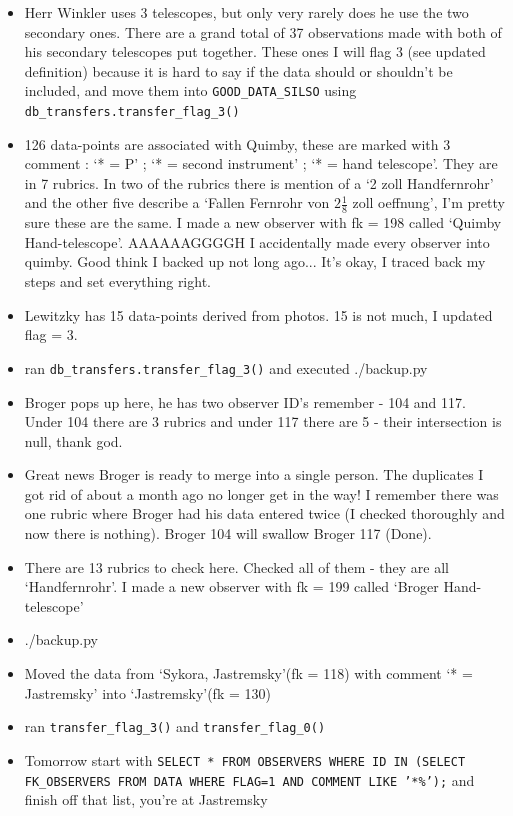 \documentclass[12pt]{article}
\begin{document}
\begin{itemize}
    \item Herr Winkler uses 3 telescopes, but only very rarely does he use the two secondary ones. There are a grand total of 37 observations made with both of his secondary telescopes put together. These ones I will flag 3 (see updated definition) because it is hard to say if the data should or shouldn't be included, and move them into \texttt{GOOD\_DATA\_SILSO} using \texttt{db\_transfers.transfer\_flag\_3()}
    \item 126 data-points are associated with Quimby, these are marked with 3 comment : `* = P' ; `* = second instrument' ; `* = hand telescope'. They are in 7 rubrics. In two of the rubrics there is mention of a `2 zoll Handfernrohr' and the other five describe a `Fallen Fernrohr von $2\frac{1}{8}$ zoll oeffnung', I'm pretty sure these are the same. I made a new observer with fk = 198 called `Quimby Hand-telescope'. AAAAAAGGGGH I accidentally made every observer into quimby. Good think I backed up not long ago... It's okay, I traced back my steps and set everything right.
    \item Lewitzky has 15 data-points derived from photos. 15 is not much, I updated flag = 3.
    \item ran \texttt{db\_transfers.transfer\_flag\_3()} and executed ./backup.py
    \item Broger pops up here, he has two observer ID's remember - 104 and 117. Under 104 there are 3 rubrics and under 117 there are 5 - their intersection is null, thank god. 
    \item Great news Broger is ready to merge into a single person. The duplicates I got rid of about a month ago no longer get in the way! I remember there was one rubric where Broger had his data entered twice (I checked thoroughly and now there is nothing). Broger 104 will swallow Broger 117 (Done).
    \item There are 13 rubrics to check here. Checked all of them - they are all `Handfernrohr'. I made a new observer with fk = 199 called `Broger Hand-telescope'
    \item ./backup.py
    \item Moved the data from `Sykora, Jastremsky'(fk = 118) with comment `* = Jastremsky' into `Jastremsky'(fk = 130)
    \item ran \texttt{transfer\_flag\_3()} and \texttt{transfer\_flag\_0()}
    \item Tomorrow start with \texttt{SELECT * FROM OBSERVERS WHERE ID IN (SELECT FK\_OBSERVERS FROM DATA WHERE FLAG=1 AND COMMENT LIKE '*\%');} and finish off that list, you're at Jastremsky
\end{itemize}
\end{document}
